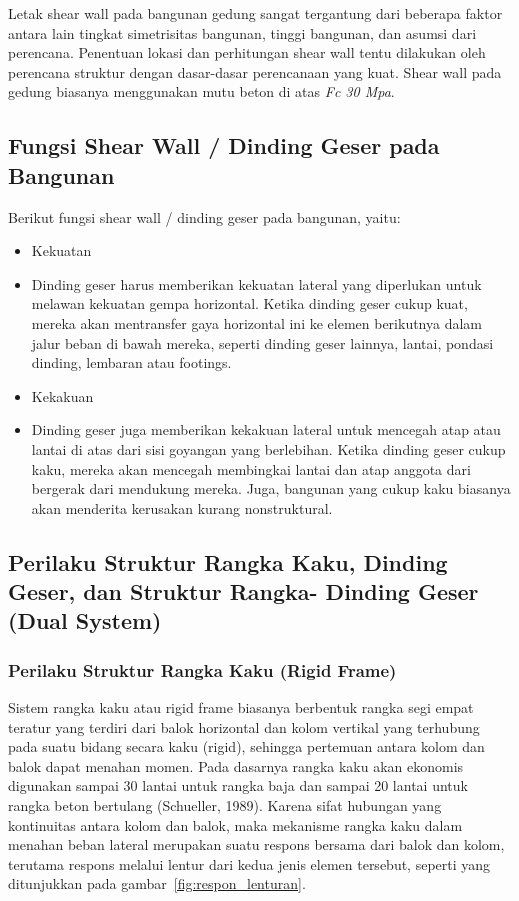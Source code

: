 \documentclass[../modul_skb.tex]{subfiles}
\begin{document}
Letak shear wall pada bangunan gedung sangat tergantung dari beberapa faktor antara lain tingkat simetrisitas bangunan, tinggi bangunan, dan asumsi dari perencana. Penentuan lokasi dan perhitungan shear wall tentu dilakukan oleh perencana struktur dengan dasar-dasar perencanaan yang kuat. Shear wall pada gedung biasanya menggunakan mutu beton di atas \textit{Fc 30 Mpa}.


\subsection{Fungsi Shear Wall / Dinding Geser pada Bangunan}%
\label{sub:Fungsi Shear Wall / Dinding Geser pada Bangunan}

Berikut fungsi shear wall / dinding geser pada bangunan, yaitu:

\begin{itemize}
	\item Kekuatan
	\item[] Dinding geser harus memberikan kekuatan lateral yang diperlukan untuk melawan kekuatan gempa horizontal. Ketika dinding geser cukup kuat, mereka akan mentransfer gaya horizontal ini ke elemen berikutnya dalam jalur beban di bawah mereka, seperti dinding geser lainnya, lantai, pondasi dinding, lembaran atau footings.
	\item Kekakuan
	\item[] Dinding geser juga memberikan kekakuan lateral untuk mencegah atap atau lantai di atas dari sisi goyangan yang berlebihan. Ketika dinding geser cukup kaku, mereka akan mencegah membingkai lantai dan atap anggota dari bergerak dari mendukung mereka. Juga, bangunan yang cukup kaku biasanya akan menderita kerusakan kurang nonstruktural.
\end{itemize}

\subsection{Perilaku Struktur Rangka Kaku, Dinding Geser, dan Struktur Rangka- Dinding Geser (Dual System)}%
\label{sub:Perilaku Struktur Rangka Kaku, Dinding Geser, dan Struktur Rangka- Dinding Geser (Dual System)}

\subsubsection{Perilaku Struktur Rangka Kaku (Rigid Frame)}%
\label{ssub:Perilaku Struktur Rangka Kaku (Rigid Frame)}

Sistem rangka kaku atau rigid frame biasanya berbentuk rangka segi empat teratur yang terdiri dari balok horizontal dan kolom vertikal yang terhubung pada suatu bidang secara kaku (rigid), sehingga pertemuan antara kolom dan balok dapat menahan momen. Pada dasarnya rangka kaku akan ekonomis digunakan sampai 30 lantai untuk rangka baja dan sampai 20 lantai untuk rangka beton bertulang (Schueller, 1989). Karena sifat hubungan yang kontinuitas antara kolom dan balok, maka mekanisme rangka kaku dalam menahan beban lateral merupakan suatu respons bersama dari balok dan kolom, terutama respons melalui lentur dari kedua jenis elemen tersebut, seperti yang ditunjukkan pada gambar~\ref{fig:respon_lenturan}.
\end{document}
